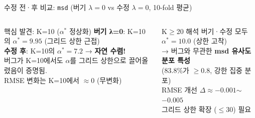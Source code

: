 \documentclass[aspectratio=169,10pt]{beamer}
\begin{document}
\begin{frame}[shrink=20]{수정 전·후 비교: \texttt{msd} \textnormal{\small(버기 $\lambda=0$ vs 수정 $\lambda=0$, 10-fold 평균)}}
\begin{columns}[T]
			\begin{alertblock}{핵심 발견: K=10 ($\alpha^*$ 정상화)}
				\small
				\textbf{버기 λ=0}: K=10의 $\alpha^*=9.95$ (그리드 상한 근접)\\
				\textbf{수정 후}: K=10의 $\alpha^*=7.2$ → \textbf{자연 수렴!}\\
				\vspace{0.3em}
				버그가 K=10에서도 $\alpha$를 그리드 상한으로 끌어올렸음이 증명됨.\\
				RMSE 변화는 K=10에서 $\approx 0$ (무변화)
			\end{alertblock}
			\begin{block}{K$\geq$20 해석}
				\small
				버기·수정 모두 $\alpha^*=10.0$ (상한 고착)\\
				→ 버그와 무관한 \textbf{msd 유사도 분포 특성}\\
				(83.8\%가 $\geq 0.8$, 강한 집중 분포)\\
				RMSE 개선 $\Delta\approx-0.001$$\sim$$-0.005$\\
				\textcolor{negred}{그리드 상한 확장 ($\leq 30$) 필요}
			\end{block}
	\end{columns}
\end{frame}
\end{document}
